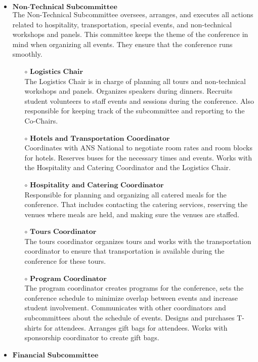 \begin{itemize}
	\item $\textbf{Non-Technical Subcommittee}$\\
	The Non-Technical Subcommittee oversees, arranges, and executes all actions related to hospitality, transportation, special events, and non-technical workshops and panels. This committee keeps the theme of the conference in mind when organizing all events. They ensure that the conference runs smoothly.
	\begin{itemize}
		\item[$\circ$] $\textbf{Logistics Chair}$\\
		The Logistics Chair is in charge of planning all tours and non-technical workshops and panels. Organizes speakers during dinners. Recruits student volunteers to staff events and sessions during the conference.
		Also responsible for keeping track of the subcommittee and reporting to the Co-Chairs.
		\item[$\circ$] $\textbf{Hotels and Transportation Coordinator}$\\
		Coordinates with ANS National to negotiate room rates and room blocks for hotels. Reserves buses for the
		necessary times and events. Works with the Hospitality and Catering Coordinator and the Logistics Chair.
		\item[$\circ$] $\textbf{Hospitality and Catering Coordinator}$\\
		Responsible for planning and organizing all catered meals for
                        the conference. That includes contacting the catering services, reserving the venues where meals are held, and making sure the venues are staffed.
		\item[$\circ$]$\textbf{Tours Coordinator}$\\
		The tours coordinator organizes tours and works with the transportation coordinator to ensure that transportation is available during the conference for these tours.
		\item[$\circ$]$\textbf{Program Coordinator}$\\
		The program coordinator creates programs for the conference, sets the conference schedule to minimize overlap between events and increase student involvement. Communicates with other coordinators and subcommittees about the schedule of events. Designs and purchases T-shirts for attendees. Arranges gift bags for attendees. Works with sponsorship coordinator to create gift bags.
	\end{itemize}
	\item $\textbf{Financial Subcommittee}$\\

\end{itemize}
